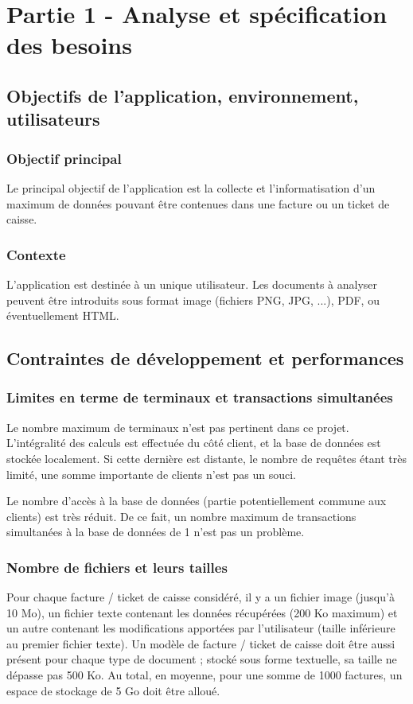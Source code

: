 \chapter{Partie 1 - Analyse et spécification des besoins}

\section{Objectifs de l'application, environnement, utilisateurs}

\subsection{Objectif principal}
Le principal objectif de l'application est la collecte et l'informatisation d'un maximum de données pouvant être contenues dans une facture ou un ticket de caisse.  

\subsection{Contexte}
L'application est destinée à un unique utilisateur. Les documents à analyser peuvent être introduits sous format image (fichiers PNG, JPG, ...), PDF, ou éventuellement HTML.

\section{Contraintes de développement et performances}

\subsection{Limites en terme de terminaux et transactions simultanées}
Le nombre maximum de terminaux n’est pas pertinent dans ce projet. L’intégralité des calculs est effectuée du côté client, et la base de données est stockée localement. Si cette dernière est distante, le nombre de requêtes étant très limité, une somme importante de clients n’est pas un souci.

Le nombre d’accès à la base de données (partie potentiellement commune aux clients) est très réduit. De ce fait, un nombre maximum de transactions simultanées à la base de données de 1 n’est pas un problème.

\subsection{Nombre de fichiers et leurs tailles}
Pour chaque facture / ticket de caisse considéré, il y a un fichier image (jusqu’à 10 Mo), un fichier texte contenant les données récupérées (200 Ko maximum) et un autre contenant les modifications apportées par l'utilisateur (taille inférieure au premier fichier texte). Un modèle de facture / ticket de caisse doit être aussi présent pour chaque type de document ; stocké sous forme textuelle, sa taille ne dépasse pas 500 Ko.
Au total, en moyenne, pour une somme de 1000 factures, un espace de stockage de 5 Go doit être alloué.

